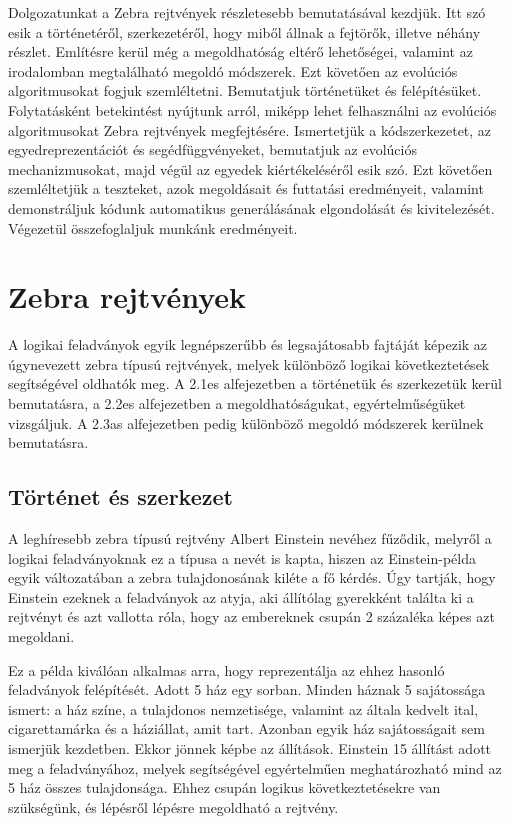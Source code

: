 \documentclass[12pt,a4paper,oneside]{report}
\begin{document}
	Dolgozatunkat a Zebra rejtvények részletesebb bemutatásával kezdjük.
    Itt szó esik a történetéről, szerkezetéről, hogy miből állnak a fejtörők, illetve néhány részlet.
    Említésre kerül még a megoldhatóság eltérő lehetőségei, valamint az irodalomban megtalálható megoldó módszerek. Ezt követően az evolúciós algoritmusokat fogjuk szemléltetni.
    Bemutatjuk történetüket és felépítésüket.
    Folytatásként betekintést nyújtunk arról, miképp lehet felhasználni az evolúciós algoritmusokat Zebra rejtvények megfejtésére.
    Ismertetjük a kódszerkezetet, az egyedreprezentációt és segédfüggvényeket, bemutatjuk az evolúciós mechanizmusokat, majd végül az egyedek kiértékeléséről esik szó.
    Ezt követően szemléltetjük a teszteket, azok megoldásait és futtatási eredményeit, valamint demonstráljuk kódunk automatikus generálásának elgondolását és kivitelezését.
    Végezetül összefoglaljuk munkánk eredményeit.

\chapter{Zebra rejtvények} %

	A logikai feladványok egyik legnépszerűbb és legsajátosabb fajtáját képezik az úgynevezett zebra típusú rejtvények, melyek különböző logikai következtetések segítségével oldhatók meg. A 2.1es alfejezetben a történetük és szerkezetük kerül bemutatásra, a 2.2es alfejezetben a megoldhatóságukat, egyértelműségüket vizsgáljuk. A 2.3as alfejezetben pedig különböző megoldó módszerek kerülnek bemutatásra.
    
    \section{Történet és szerkezet} %

A leghíresebb zebra típusú rejtvény Albert Einstein nevéhez fűződik, melyről a logikai feladványoknak ez a típusa a nevét is kapta, hiszen az Einstein-példa egyik változatában a zebra tulajdonosának kiléte a fő kérdés. Úgy tartják, hogy Einstein ezeknek a feladványok az atyja, aki állítólag gyerekként találta ki a rejtvényt és azt vallotta róla, hogy az embereknek csupán 2 százaléka képes azt megoldani.

Ez a példa kiválóan alkalmas arra, hogy reprezentálja az ehhez hasonló feladványok felépítését. Adott 5 ház egy sorban. Minden háznak 5 sajátossága ismert: a ház színe, a tulajdonos nemzetisége, valamint az általa kedvelt ital, cigarettamárka és a háziállat, amit tart. Azonban egyik ház sajátosságait sem ismerjük kezdetben. Ekkor jönnek képbe az állítások. Einstein 15 állítást adott meg a feladványához, melyek segítségével egyértelműen meghatározható mind az 5 ház összes tulajdonsága. Ehhez csupán logikus következtetésekre van szükségünk, és lépésről lépésre megoldható a rejtvény.
\end{document}

